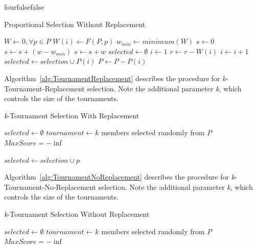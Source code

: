 \documentclass[times,12pt,titlepage]{mstogs}
\begin{document}
\begin{ThesisAppendix}{four}{false}{false}
\begin{algorithm}
\caption{Proportional Selection Without Replacement}
\label{alg:ProportionalNoReplacement}
\begin{algorithmic}[1]
 \label{proc:ProportionalNoReplacement}
	\State $W \leftarrow 0,\forall p \in P$
		\State $W(i) \leftarrow F(P,p)$
	\EndFor
	\State $w_{min} \leftarrow minimum(W)$	
	\State $s \leftarrow 0$
			\State $s \leftarrow s + (w - w_{min} )$			
		\Else
			\State $s \leftarrow s + w$		
		\EndIf	
	\EndFor
	\State $selected \leftarrow \emptyset$
		\State $i \leftarrow 1$
			\State $r \leftarrow r - W(i)$
			\State $i \leftarrow i + 1$
		\EndWhile	
		\State $selected \leftarrow selection \cup P(i)$
		\State $P \leftarrow P - P(i)$
	\EndFor
\EndProcedure
\end{algorithmic}
\end{algorithm}

Algorithm~\ref{alg:TournamentReplacement} describes the procedure for \textit{k}-Tournament-Replacement selection. Note the additional parameter \textit{k}, which controls the size of the tournaments.

\begin{algorithm}
\caption{\textit{k}-Tournament Selection With Replacement}
\label{alg:TournamentReplacement}
\begin{algorithmic}[1]
 \label{proc:TournamentReplacement}
	\State $selected \leftarrow \emptyset$
		\State $tournament \leftarrow k$ members selected randomly from $P$
		\State $MaxScore = -\inf$

			\EndIf			
		\EndFor
		\State $selected \leftarrow selection \cup p$
	\EndFor
\EndProcedure
\end{algorithmic}
\end{algorithm}

Algorithm~\ref{alg:TournamentNoReplacement} describes the procedure for \textit{k}-Tournament-No-Replacement selection. Note the additional parameter \textit{k}, which controls the size of the tournaments.

\begin{algorithm}
\caption{\textit{k}-Tournament Selection Without Replacement}
\label{alg:TournamentNoReplacement}
\begin{algorithmic}[1]
 \label{proc:TournamentNoReplacement}
	\State $selected \leftarrow \emptyset$
		\State $tournament \leftarrow k$ members selected randomly from $P$
		\State $MaxScore = -\inf$


\end{algorithmic}
\end{algorithm}
\end{ThesisAppendix}
\end{document}
